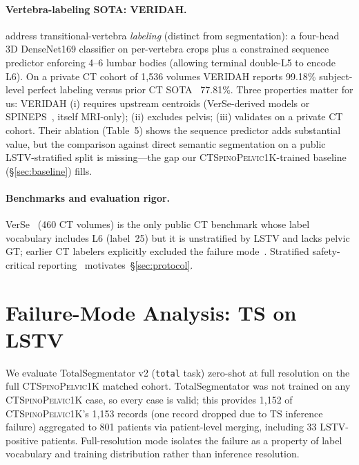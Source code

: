 \documentclass{article}
\newcommand{\dataset}{\textsc{CTSpinoPelvic1K}}
\newcommand{\SOTA}{TotalSegmentator}
\newcommand{\sota}{TS}
\newcommand{\VERIDAH}{VERIDAH}
\newcommand{\VerSe}{VerSe}
\begin{document}
\paragraph{Vertebra-labeling SOTA: \VERIDAH{}.}
\citet{Moller2026VERIDAH:Sequences} address transitional-vertebra
\emph{labeling} (distinct from segmentation): a four-head
3D DenseNet169 classifier on per-vertebra crops plus a
constrained sequence predictor enforcing 4--6 lumbar bodies
(allowing terminal double-L5 to encode L6). On a private
CT cohort of 1{,}536 volumes \VERIDAH{} reports 99.18\%
subject-level perfect labeling versus prior CT
SOTA~\citep{Meng2023VertebraeCycle} 77.81\%. Three
properties matter for us: \VERIDAH{} (i) requires upstream
centroids (\VerSe{}-derived models or
SPINEPS~\citep{Moller2024SPINEPSautomaticSegmentation},
itself MRI-only); (ii) excludes pelvis; (iii) validates on
a private CT cohort. Their ablation (Table~5) shows the
sequence predictor adds substantial value, but the
comparison against direct semantic segmentation on a
public LSTV-stratified split is missing---the gap our
\dataset{}-trained baseline (\S\ref{sec:baseline}) fills.

\paragraph{Benchmarks and evaluation rigor.}
\VerSe{}~\citep{Sekuboyina2021VerSe:Images} (460 CT volumes)
is the only public CT benchmark whose label vocabulary
includes L6 (label~25) but it is unstratified by LSTV and
lacks pelvic GT; earlier CT labelers explicitly excluded
the failure mode~\citep{Sekuboyina2020LabelingAnatomy}.
Stratified safety-critical
reporting~\citep{Maier-Hein2024MetricsValidation}
motivates~\S\ref{sec:protocol}.

\section{Failure-Mode Analysis: \sota{} on LSTV}
\label{sec:audit}

We evaluate \SOTA{} v2 (\texttt{total} task) zero-shot at
full resolution on the full \dataset{} matched cohort.
\SOTA{} was not trained on any \dataset{} case, so every
case is valid; this provides 1{,}152 of \dataset{}'s
1{,}153 records (one record dropped due to \sota{}
inference failure) aggregated to 801 patients via
patient-level merging, including 33 LSTV-positive
patients. Full-resolution mode isolates the failure as a
property of label vocabulary and training distribution
rather than inference resolution.
\end{document}

